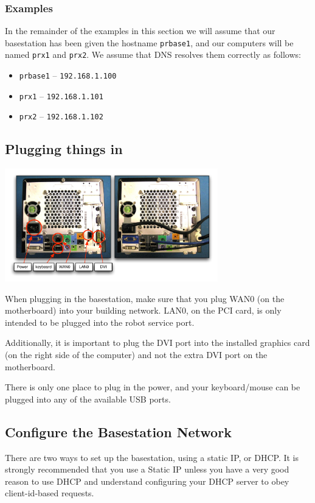 \subsubsection{Examples}

In the remainder of the examples in this section we will assume that
our basestation has been given the hostname \texttt{prbase1}, and our
computers will be named \texttt{prx1} and \texttt{prx2}.  We assume
that DNS resolves them correctly as follows:

\begin{itemize}
\item \texttt{prbase1} -- \texttt{192.168.1.100}
\item \texttt{prx1} -- \texttt{192.168.1.101}
\item \texttt{prx2} -- \texttt{192.168.1.102}
\end{itemize}

\subsection{Plugging things in}
\includegraphics[width=350px]{images/pr2_basestation_plugs.pdf}

When plugging in the basestation, make sure that you plug WAN0 (on the
motherboard) into your building network.  LAN0, on the PCI card, is
only intended to be plugged into the robot service port.

Additionally, it is important to plug the DVI port into the installed
graphics card (on the right side of the computer) and not the extra
DVI port on the motherboard.

There is only one place to plug in the power, and your keyboard/mouse
can be plugged into any of the available USB ports.

\subsection{Configure the Basestation Network}

There are two ways to set up the basestation, using a static IP, or
DHCP.  It is strongly recommended that you use a Static IP unless you
have a very good reason to use DHCP and understand configuring your
DHCP server to obey client-id-based requests.

